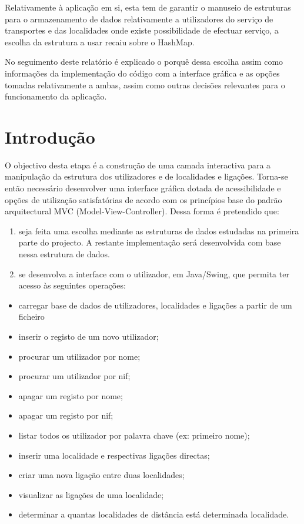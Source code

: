\documentclass[a5paper,twocolumn, 11pt]{article}
\begin{document}
Relativamente à aplicação em si, esta tem de garantir o manuseio de estruturas para o armazenamento de dados relativamente a utilizadores do serviço de transportes e das localidades onde existe possibilidade de efectuar serviço, a escolha da estrutura a usar recaiu sobre o HashMap. 

No seguimento deste relatório é explicado o porquê dessa escolha assim como informações da implementação do código com a interface gráfica e as opções tomadas relativamente a ambas, assim como outras decisões relevantes para o funcionamento da aplicação.


\clearpage
\section{Introdução}
O objectivo desta etapa é a construção de uma camada interactiva para a manipulação da estrutura dos utilizadores e de localidades e ligações. Torna-se então necessário desenvolver uma interface gráfica dotada de acessibilidade e opções de utilização satisfatórias de acordo com os princípios base do padrão arquitectural MVC (Model-View-Controller).
Dessa forma é pretendido que:

\begin{enumerate}
    \item{seja feita uma escolha mediante as estruturas de dados estudadas na primeira parte do projecto. A restante implementação será desenvolvida com base nessa estrutura de dados.}
    \item{se desenvolva a interface com o utilizador, em Java/Swing, que permita ter acesso às seguintes operações:}
\end{enumerate}
\begin{itemize}
    \item{carregar base de dados de utilizadores, localidades e ligações a partir de um ficheiro}
    \item{inserir o registo de um novo utilizador;}
    \item{procurar um utilizador por nome;}
    \item{procurar um utilizador por nif;}
    \item{apagar um registo por nome;}
    \item{apagar um registo por nif;}
    \item{listar todos os utilizador por palavra chave (ex: primeiro nome);}
    \item{inserir uma localidade e respectivas ligações directas;}
    \item{criar uma nova ligação entre duas localidades;}
    \item{visualizar as ligações de uma localidade;}
    \item{determinar a quantas localidades de distância está determinada localidade.}
\end{itemize}
\end{document}
